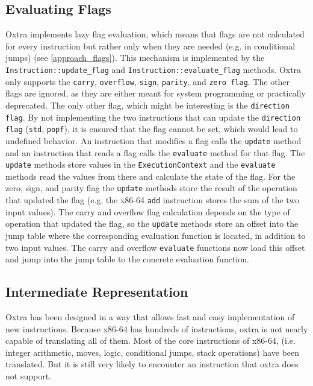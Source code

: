 \subsection{Evaluating Flags}
	\label{documentation_flags}
	Oxtra implements lazy flag evaluation, which means that flags are not calculated for every instruction but rather only when they are needed (e.g. in conditional jumps) (see \ref{approach_flags}). This mechanism is implemented by the \texttt{Instruction::update\_flag} and \texttt{Instruction::evaluate\_flag} methods. Oxtra only supports the \texttt{carry}, \texttt{overflow}, \texttt{sign}, \texttt{parity}, and \texttt{zero flag}. The other flags are ignored, as they are either meant for system programming or practically deprecated. The only other flag, which might be interesting is the \texttt{direction flag}. By not implementing the two instructions that can update the \texttt{direction flag} (\texttt{std}, \texttt{popf}), it is ensured that the flag cannot be set, which would lead to undefined behavior.
	An instruction that modifies a flag calls the \texttt{update} method and an instruction that reads a flag calls the \texttt{evaluate} method for that flag. The \texttt{update} methods store values in the \texttt{ExecutionContext} and the \texttt{evaluate} methods read the values from there and calculate the state of the flag. For the zero, sign, and parity flag the \texttt{update} methods store the result of the operation that updated the flag (e.g. the x86-64 \texttt{add} instruction stores the sum of the two input values). The carry and overflow flag calculation depends on the type of operation that updated the flag, so the \texttt{update} methods store an offset into the jump table where the corresponding evaluation function is located, in addition to two input values. The carry and overflow \texttt{evaluate} functions now load this offset and jump into the jump table to the concrete evaluation function.

\subsection{Intermediate Representation}
	Oxtra has been designed in a way that allows fast and easy implementation of new instructions. Because x86-64 has hundreds of instructions, oxtra is not nearly capable of translating all of them. Most of the core instructions of x86-64, (i.e. integer arithmetic, moves, logic, conditional jumps, stack operations) have been translated. But it is still very likely to encounter an instruction that oxtra does not support.
	
